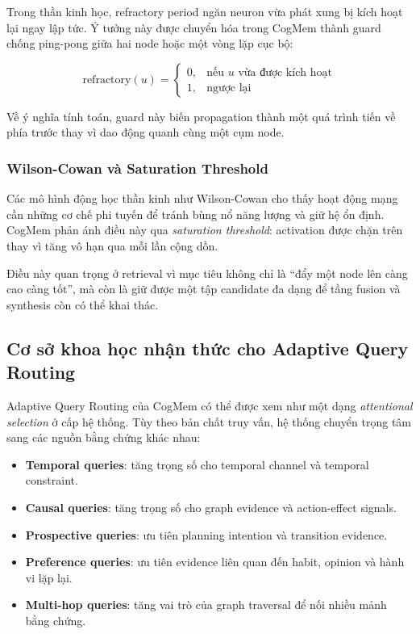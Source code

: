 \documentclass[../main.tex]{subfiles}
\begin{document}
Trong thần kinh học, refractory period ngăn neuron vừa phát xung bị kích hoạt lại ngay lập tức. Ý tưởng này được chuyển hóa trong CogMem thành guard chống ping-pong giữa hai node hoặc một vòng lặp cục bộ:

\begin{equation}
\mathrm{refractory}(u) =
\begin{cases}
0, & \text{nếu } u \text{ vừa được kích hoạt} \\
1, & \text{ngược lại}
\end{cases}
\end{equation}

Về ý nghĩa tính toán, guard này biến propagation thành một quá trình tiến về phía trước thay vì dao động quanh cùng một cụm node.

\subsubsection{Wilson-Cowan và Saturation Threshold}

Các mô hình động học thần kinh như Wilson-Cowan cho thấy hoạt động mạng cần những cơ chế phi tuyến để tránh bùng nổ năng lượng và giữ hệ ổn định. CogMem phản ánh điều này qua \textit{saturation threshold}: activation được chặn trên thay vì tăng vô hạn qua mỗi lần cộng dồn.

Điều này quan trọng ở retrieval vì mục tiêu không chỉ là ``đẩy một node lên càng cao càng tốt'', mà còn là giữ được một tập candidate đa dạng để tầng fusion và synthesis còn có thể khai thác.

\subsection{Cơ sở khoa học nhận thức cho Adaptive Query Routing}

Adaptive Query Routing của CogMem có thể được xem như một dạng \textit{attentional selection} ở cấp hệ thống. Tùy theo bản chất truy vấn, hệ thống chuyển trọng tâm sang các nguồn bằng chứng khác nhau:

\begin{itemize}
    \item \textbf{Temporal queries}: tăng trọng số cho temporal channel và temporal constraint.
    \item \textbf{Causal queries}: tăng trọng số cho graph evidence và action-effect signals.
    \item \textbf{Prospective queries}: ưu tiên planning intention và transition evidence.
    \item \textbf{Preference queries}: ưu tiên evidence liên quan đến habit, opinion và hành vi lặp lại.
    \item \textbf{Multi-hop queries}: tăng vai trò của graph traversal để nối nhiều mảnh bằng chứng.
\end{itemize}
\end{document}
